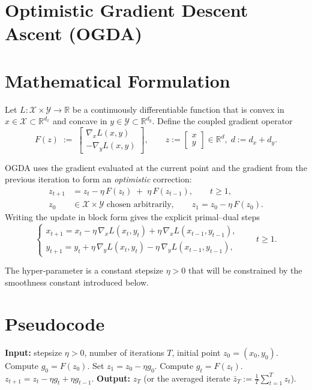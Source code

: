 \documentclass{article}
\begin{document}
\section*{Optimistic Gradient Descent Ascent (OGDA)}

\section*{Mathematical Formulation}
Let $L:\mathcal X\times\mathcal Y\rightarrow\mathbb R$ be a continuously differentiable function that is convex in $x\in\mathcal X\subset\mathbb R^{d_x}$ and concave in $y\in\mathcal Y\subset\mathbb R^{d_y}$.  
Define the coupled gradient operator
\[
F(z)\;:=\;
\begin{bmatrix}
\nabla_{x}L(x,y)\\[2mm]
-\nabla_{y}L(x,y)
\end{bmatrix},
\qquad 
z:=\begin{bmatrix}x\\y\end{bmatrix}\in\mathbb R^{d},\; d:=d_x+d_y .
\]

OGDA uses the gradient evaluated at the current point and the gradient from the previous iteration to form an \emph{optimistic} correction:
\[
\boxed{
\begin{aligned}
z_{t+1}
&= z_{t}-\eta\,F(z_{t})\;+\;\eta\,F(z_{t-1}),\qquad t\ge 1,\\
z_{0}&\in\mathcal X\times\mathcal Y\;\text{chosen arbitrarily},\qquad 
z_{1}=z_{0}-\eta\,F(z_{0}) .
\end{aligned}}
\]
Writing the update in block form gives the explicit primal–dual steps
\[
\begin{cases}
x_{t+1}=x_{t}-\eta\,\nabla_{x}L(x_{t},y_{t})+\eta\,\nabla_{x}L(x_{t-1},y_{t-1}),\\[2mm]
y_{t+1}=y_{t}+\eta\,\nabla_{y}L(x_{t},y_{t})-\eta\,\nabla_{y}L(x_{t-1},y_{t-1}),
\end{cases}
\qquad t\ge 1 .
\]

The hyper‑parameter is a constant stepsize $\eta>0$ that will be constrained by the smoothness constant introduced below.

\section*{Pseudocode}
\begin{algorithm}[H]
\caption{Optimistic Gradient Descent Ascent (OGDA)}
\begin{algorithmic}[1]
\STATE \textbf{Input:} stepsize $\eta>0$, number of iterations $T$, initial point $z_{0}=(x_{0},y_{0})$.
\STATE Compute $g_{0}=F(z_{0})$.
\STATE Set $z_{1}=z_{0}-\eta g_{0}$.
    \STATE Compute $g_{t}=F(z_{t})$.
    \STATE $z_{t+1}=z_{t}-\eta g_{t}+\eta g_{t-1}$.
\ENDFOR
\STATE \textbf{Output:} $z_{T}$ (or the averaged iterate $\bar z_T:=\frac1T\sum_{t=1}^{T}z_t$).
\end{algorithmic}
\end{algorithm}
\end{document}
